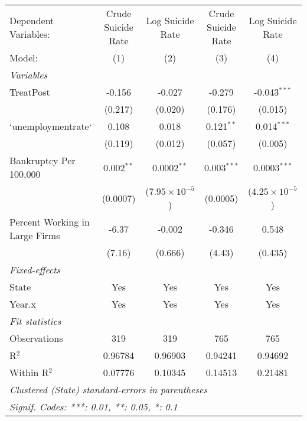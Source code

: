 \begingroup
\centering
\begin{tabular}{lcccc}
   \tabularnewline \midrule \midrule
   Dependent Variables:           & Crude Suicide Rate & Log Suicide Rate        & Crude Suicide Rate & Log Suicide Rate\\  
   Model:                         & (1)                & (2)                     & (3)                & (4)\\  
   \midrule
   \emph{Variables}\\
   TreatPost                      & -0.156             & -0.027                  & -0.279             & -0.043$^{***}$\\   
                                  & (0.217)            & (0.020)                 & (0.176)            & (0.015)\\   
   `unemploymentrate`             & 0.108              & 0.018                   & 0.121$^{**}$       & 0.014$^{***}$\\   
                                  & (0.119)            & (0.012)                 & (0.057)            & (0.005)\\   
   Bankruptcy Per 100,000         & 0.002$^{**}$       & 0.0002$^{**}$           & 0.003$^{***}$      & 0.0003$^{***}$\\   
                                  & (0.0007)           & ($7.95\times 10^{-5}$)  & (0.0005)           & ($4.25\times 10^{-5}$)\\    
   Percent Working in Large Firms & -6.37              & -0.002                  & -0.346             & 0.548\\   
                                  & (7.16)             & (0.666)                 & (4.43)             & (0.435)\\   
   \midrule
   \emph{Fixed-effects}\\
   State                          & Yes                & Yes                     & Yes                & Yes\\  
   Year.x                         & Yes                & Yes                     & Yes                & Yes\\  
   \midrule
   \emph{Fit statistics}\\
   Observations                   & 319                & 319                     & 765                & 765\\  
   R$^2$                          & 0.96784            & 0.96903                 & 0.94241            & 0.94692\\  
   Within R$^2$                   & 0.07776            & 0.10345                 & 0.14513            & 0.21481\\  
   \midrule \midrule
   \multicolumn{5}{l}{\emph{Clustered (State) standard-errors in parentheses}}\\
   \multicolumn{5}{l}{\emph{Signif. Codes: ***: 0.01, **: 0.05, *: 0.1}}\\
\end{tabular}
\par\endgroup


